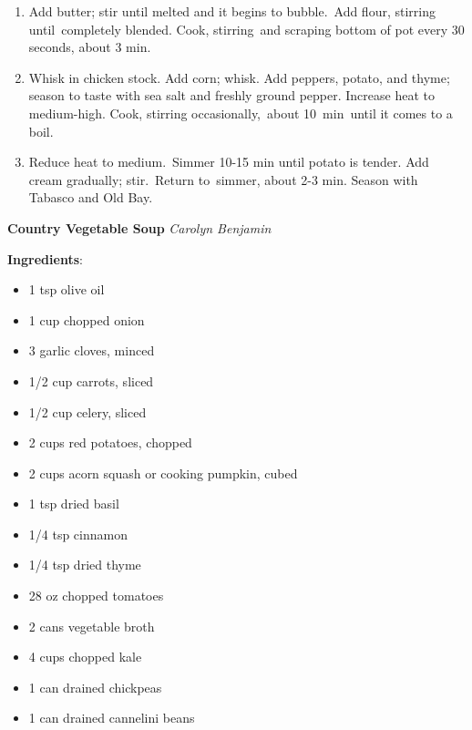 \documentclass[11pt, twoside, openany]{book}
\begin{document}
\begin{minipage}[t]{\linewidth}
\begin{enumerate}
\item Add butter; stir until melted and it begins to bubble. Add flour, stirring until completely blended. Cook, stirring and scraping bottom of pot every 30 seconds, about 3 min.
\item Whisk in chicken stock. Add corn; whisk. Add peppers, potato, and thyme; season to taste with sea salt and freshly ground pepper. Increase heat to medium-high. Cook, stirring occasionally, about 10 min until it comes to a boil.
\item Reduce heat to medium. Simmer 10-15 min until potato is tender. Add cream gradually; stir. Return to simmer, about 2-3 min. Season with Tabasco and Old Bay.
\end{enumerate}
\end{minipage}\vspace{8mm}
\noindent\begin{minipage}[t]{\linewidth}%
{\Large\textbf{Country Vegetable Soup}} \label{country-vegetable-soup}\hfill\textit{Carolyn Benjamin}\\
\noindent\begin{minipage}[t]{0.78\linewidth}%
\textbf{Ingredients}:\vspace{-3mm}
\begin{multicols}{2}
\begin{itemize}\setlength\itemsep{-1mm}
\item 1 tsp olive oil
\item 1 cup chopped onion
\item 3 garlic cloves, minced
\item 1/2 cup carrots, sliced
\item 1/2 cup celery, sliced
\item 2 cups red potatoes, chopped
\item 2 cups acorn squash or cooking pumpkin, cubed
\item 1 tsp dried basil
\item 1/4 tsp cinnamon
\item 1/4 tsp dried thyme
\item 28 oz chopped tomatoes
\item 2 cans vegetable broth
\item 4 cups chopped kale
\item 1 can drained chickpeas
\item 1 can drained cannelini beans
\end{itemize}
\end{multicols}
\end{minipage}

\end{minipage}
\end{document}
